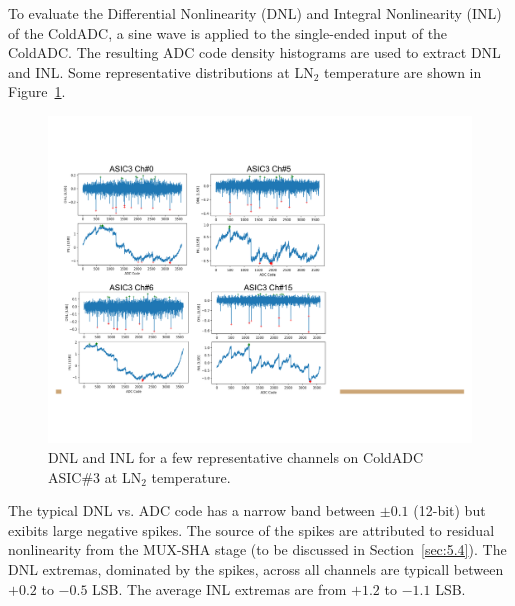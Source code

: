 \label{sec:4.2}


To evaluate the Differential Nonlinearity (DNL) and Integral Nonlinearity (INL) of the ColdADC, a sine wave is applied to the single-ended input of the ColdADC. The resulting ADC code density histograms are used to extract DNL and INL. Some representative distributions at LN$_2$ temperature are shown in Figure~\ref{fig:adc_inldnl}.

\begin{figure}[htb]
\centering
\begin{center}
\includegraphics[width=1.0\textwidth]{figures/ColdADC_StaticLinearity.pdf}
\end{center}
\caption{DNL and INL for a few representative channels on ColdADC ASIC\#3 at LN$_2$ temperature.}
\label{fig:adc_inldnl}
\end{figure}

The typical DNL vs. ADC code has a narrow band between $\pm 0.1$ (12-bit) but exibits large negative spikes. The source of the spikes are attributed to residual nonlinearity from the MUX-SHA stage (to be discussed in Section~\ref{sec:5.4}). The DNL extremas, dominated by the spikes, across all channels are typicall between $+0.2$ to $-0.5$ LSB. The average INL extremas are from $+1.2$ to $-1.1$ LSB.



